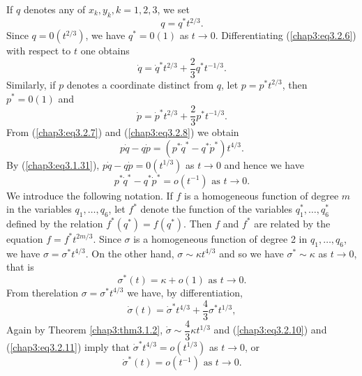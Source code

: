 If $q$ denotes any of $x_k, y_k, k = 1,2,3$, we set
\begin{equation*}
q = q^{*} t^{2/3}.\tag{3.2.6}\label{chap3:eq3.2.6}
\end{equation*}\pageoriginale
Since $q = 0 (t^{2/3})$, we have $q^* =0 (1)$ as $t \to
0$. Differentiating (\ref{chap3:eq3.2.6}) with respect to $t$ one
obtains  
\begin{equation*}
\dot{q} = \dot{q}^* t^{2/3} + \frac{2}{3}  q^*
t^{-1/3}. \tag{3.2.7}\label{chap3:eq3.2.7} 
\end{equation*}
Similarly, if $p$ denotes a coordinate distinct from $q$, let $p=p^*
t^{2/3}$, then $p^* = 0 (1)$ and  
\begin{equation*}
\dot{p} = \dot{p}^* t^{2/3} + \frac{2}{3} p^*
t^{-1/3}. \tag{3.2.8}\label{chap3:eq3.2.8} 
\end{equation*}
From (\ref{chap3:eq3.2.7}) and (\ref{chap3:eq3.2.8}) we obtain 
$$
p\dot{q} - q \dot{p} = (p^* \dot{q}^* - q^* \dot{p}^*) t^{4/3}. 
$$
By (\ref{chap3:eq3.1.31}), $p\dot{q} - q \dot{p} = 0 (t^{1/3})$ as $t
\to 0$ and hence we have 
\begin{equation*}
p^* \dot{q}^* - q^* \dot{p}^* = o (t^{-1}) \text{ as } t \to
0. \tag{3.2.9}\label{chap3:eq3.2.9} 
\end{equation*}
We introduce the following notation. If $f$ is a homogeneous function
of degree $m$ in the variables $q_1, \ldots, q_6$, let $f^*$ denote
the function of the variables  $q^*_1, \ldots, q^*_6$ defined by the
relation $f^* (q^*) = f(q^*)$. Then $f$ and $f^*$ are related by the
equation $f = f^* t^{2m/3}$. Since $\sigma $ is a homogeneous function
of degree 2 in $q_1, \ldots, q_6$, we have $\sigma = \sigma^*
t^{4/3}$. On the other hand, $\sigma \sim\kappa t^{4/3}$ and so we
have $\sigma^* \sim \kappa$ as $t \to 0$, that is  
\begin{equation*}
\sigma^* (t) = \kappa + o (1) \text{ as } t \to 0. 
\tag{3.2.10}\label{chap3:eq3.2.10}
\end{equation*}
From the\pageoriginale relation $\sigma = \sigma^* t^{4/3}$ we have,
by differentiation,  
\begin{equation*}
\dot{\sigma}(t) = \dot{\sigma}^* t^{4/3} + \frac{4}{3} \sigma^*
t^{1/3} , \tag{3.2.11}\label{chap3:eq3.2.11} 
\end{equation*}
Again by Theorem \ref{chap3:thm3.1.2}, $\dot{\sigma} \sim \dfrac{4}{3}
\kappa t^{1/3}$ and (\ref{chap3:eq3.2.10}) and (\ref{chap3:eq3.2.11})
imply that $\dot{\sigma}^* t^{4/3} = o (t^{1/3})$ as $t \to 0$, or 
\begin{equation*}
\dot{\sigma}^* (t) = o (t^{-1}) \text{ as } t \to
0. \tag{3.2.12}\label{chap3:eq3.2.12} 
\end{equation*}

